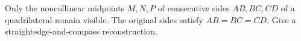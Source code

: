 Only the noncollinear midpoints $M,N,P$ of consecutive sides $AB,BC,CD$ of a quadrilateral remain visible. The original sides satisfy $AB=BC=CD$. Give a straightedge-and-compass reconstruction.
